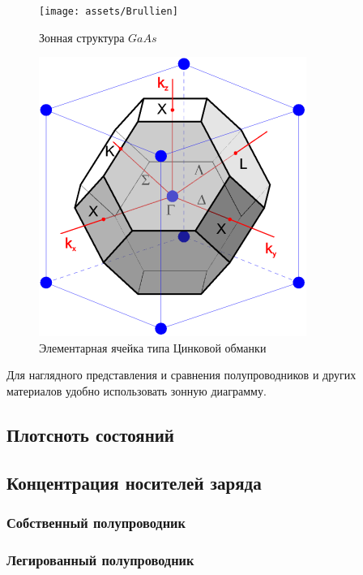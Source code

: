 \begin{figure}[h]
	\centering
    \begin{minipage}[b]{0.4\textwidth}
	    \texttt{[image: assets/Brullien]}
	    \caption{Зонная структура $GaAs$}
	\end{minipage}
	\hfill
	\begin{minipage}[b]{0.4\textwidth}
		\includegraphics[width=\textwidth]{assets/ZnLaer}
	    \caption{Элементарная ячейка типа Цинковой обманки}
	\end{minipage}
\end{figure}

Для наглядного представления и сравнения полупроводников и других материалов удобно использовать зонную диаграмму. 


\subsection{Плотсноть состояний}
\subsection{Концентрация носителей заряда}
\subsubsection{Собственный полупроводник}
\subsubsection{Легированный полупроводник}
